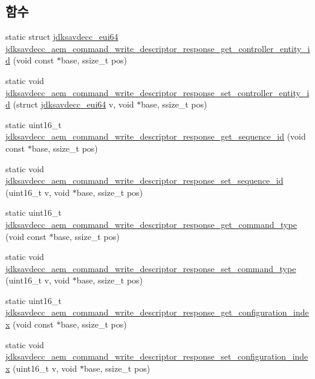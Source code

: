 \subsection*{함수}
\begin{DoxyCompactItemize}
\item 
static struct \hyperlink{structjdksavdecc__eui64}{jdksavdecc\+\_\+eui64} \hyperlink{group__command__write__descriptor__response_gad1387cfe07d148a63ef364b252823e5b}{jdksavdecc\+\_\+aem\+\_\+command\+\_\+write\+\_\+descriptor\+\_\+response\+\_\+get\+\_\+controller\+\_\+entity\+\_\+id} (void const $\ast$base, ssize\+\_\+t pos)
\item 
static void \hyperlink{group__command__write__descriptor__response_ga571631b2bfcfc3f05c7892578dbdc471}{jdksavdecc\+\_\+aem\+\_\+command\+\_\+write\+\_\+descriptor\+\_\+response\+\_\+set\+\_\+controller\+\_\+entity\+\_\+id} (struct \hyperlink{structjdksavdecc__eui64}{jdksavdecc\+\_\+eui64} v, void $\ast$base, ssize\+\_\+t pos)
\item 
static uint16\+\_\+t \hyperlink{group__command__write__descriptor__response_ga3e52079e12c68f1da6dfe6a441028cfe}{jdksavdecc\+\_\+aem\+\_\+command\+\_\+write\+\_\+descriptor\+\_\+response\+\_\+get\+\_\+sequence\+\_\+id} (void const $\ast$base, ssize\+\_\+t pos)
\item 
static void \hyperlink{group__command__write__descriptor__response_gafd1849a9da238dd0a69ffdf4c32d1021}{jdksavdecc\+\_\+aem\+\_\+command\+\_\+write\+\_\+descriptor\+\_\+response\+\_\+set\+\_\+sequence\+\_\+id} (uint16\+\_\+t v, void $\ast$base, ssize\+\_\+t pos)
\item 
static uint16\+\_\+t \hyperlink{group__command__write__descriptor__response_ga6405a75da8238f7d56f4ee7d4733bbb8}{jdksavdecc\+\_\+aem\+\_\+command\+\_\+write\+\_\+descriptor\+\_\+response\+\_\+get\+\_\+command\+\_\+type} (void const $\ast$base, ssize\+\_\+t pos)
\item 
static void \hyperlink{group__command__write__descriptor__response_ga9a3a05414761f059aff9176c8493463f}{jdksavdecc\+\_\+aem\+\_\+command\+\_\+write\+\_\+descriptor\+\_\+response\+\_\+set\+\_\+command\+\_\+type} (uint16\+\_\+t v, void $\ast$base, ssize\+\_\+t pos)
\item 
static uint16\+\_\+t \hyperlink{group__command__write__descriptor__response_ga78644abd94bda0bc1a353549ca2501b6}{jdksavdecc\+\_\+aem\+\_\+command\+\_\+write\+\_\+descriptor\+\_\+response\+\_\+get\+\_\+configuration\+\_\+index} (void const $\ast$base, ssize\+\_\+t pos)
\item 
static void \hyperlink{group__command__write__descriptor__response_ga988a0b4318975f1903a080f40910a62e}{jdksavdecc\+\_\+aem\+\_\+command\+\_\+write\+\_\+descriptor\+\_\+response\+\_\+set\+\_\+configuration\+\_\+index} (uint16\+\_\+t v, void $\ast$base, ssize\+\_\+t pos)

\end{DoxyCompactItemize}
